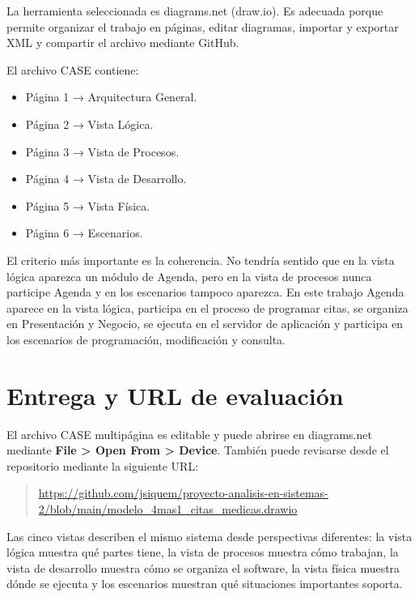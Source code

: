 La herramienta seleccionada es diagrams.net (draw.io). Es adecuada porque permite organizar el trabajo en páginas, editar diagramas, importar y exportar XML y compartir el archivo mediante GitHub.

El archivo CASE contiene:
\begin{itemize}
    \item Página 1 → Arquitectura General.
    \item Página 2 → Vista Lógica.
    \item Página 3 → Vista de Procesos.
    \item Página 4 → Vista de Desarrollo.
    \item Página 5 → Vista Física.
    \item Página 6 → Escenarios.
\end{itemize}

El criterio más importante es la coherencia. No tendría sentido que en la vista lógica aparezca un módulo de Agenda, pero en la vista de procesos nunca participe Agenda y en los escenarios tampoco aparezca. En este trabajo Agenda aparece en la vista lógica, participa en el proceso de programar citas, se organiza en Presentación y Negocio, se ejecuta en el servidor de aplicación y participa en los escenarios de programación, modificación y consulta.

\section{Entrega y URL de evaluación}

El archivo CASE multipágina es editable y puede abrirse en diagrams.net mediante \textbf{File > Open From > Device}. También puede revisarse desde el repositorio mediante la siguiente URL:

\begin{quote}
\url{https://github.com/jsiquem/proyecto-analisis-en-sistemas-2/blob/main/modelo_4mas1_citas_medicas.drawio}
\end{quote}

Las cinco vistas describen el mismo sistema desde perspectivas diferentes: la vista lógica muestra qué partes tiene, la vista de procesos muestra cómo trabajan, la vista de desarrollo muestra cómo se organiza el software, la vista física muestra dónde se ejecuta y los escenarios muestran qué situaciones importantes soporta.
\endgroup
